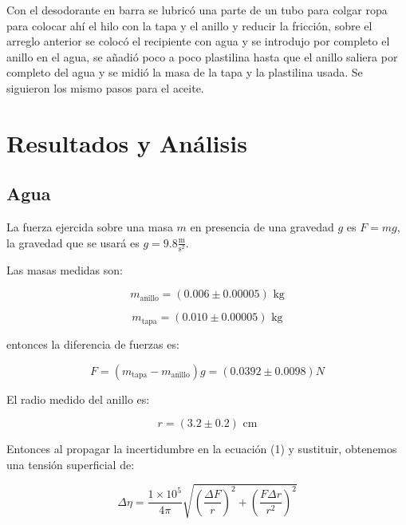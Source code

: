 \documentclass[DIV=calc, paper=a4, fontsize=11pt]{scrartcl}
\begin{document}
\begin{multicols}{2}
Con el desodorante en barra se lubricó una parte de un tubo para colgar ropa para colocar ahí el hilo con la tapa y el anillo y reducir la fricción, sobre el arreglo anterior se colocó el recipiente con agua y se introdujo por completo el anillo en el agua, se añadió poco a poco plastilina hasta que el anillo saliera por completo del agua y se midió la masa de la tapa y la plastilina usada. Se siguieron los mismo pasos para el aceite.




\section*{Resultados y Análisis}

\subsection*{Agua}

La fuerza ejercida sobre una masa $m$ en presencia de una gravedad $g$ es $F= mg$, la gravedad que se usará es $g = 9.8 \frac{\text{m}}{\text{s}^2}$.

Las masas medidas son:

\begin{equation*}
    m_{\text{anillo}}  = (0.006 \pm 0.00005)  \text{ kg} 
\end{equation*}

\begin{equation*}
     m_{\text{tapa}} = (0.010 \pm 0.00005) \text{ kg} 
\end{equation*}

entonces la diferencia de fuerzas es:

\begin{equation*}
    F= (m_{\text{tapa}} - m_{\text{anillo}})g = (0.0392 \pm 0.0098) N
\end{equation*}

El radio medido del anillo es:

\begin{equation*}
    r = (3.2 \pm 0.2) \text{ cm}
\end{equation*}

Entonces al propagar la incertidumbre en la ecuación (1) y sustituir, obtenemos una tensión superficial de:

\begin{equation*}
    \Delta \eta = \frac{1 \times 10^{5}}{4\pi}\sqrt{\left(\frac{\Delta F}{r}\right)^{2} + \left(\frac{F\Delta r}{r^2}\right)^{2}}
\end{equation*}


\end{multicols}
\end{document}
